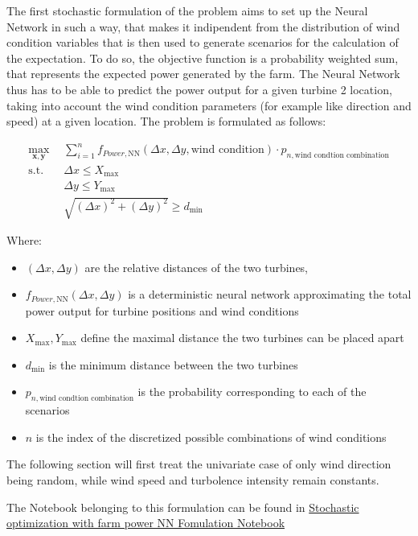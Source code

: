 \documentclass[preprint,12pt]{elsarticle}
\begin{document}
The first stochastic formulation of the problem aims to set up the Neural Network in such a way, that makes it indipendent from the distribution of wind condition variables that is then used to generate scenarios for the calculation of the expectation. To do so, the objective function is a probability weighted sum, that represents the expected power generated by the farm. The Neural Network thus  has to be able to predict the power output for a given turbine 2 location, taking into account the wind condition parameters (for example like direction and speed) at a given location. The problem is formulated as follows: 

\begin{align}
	\max_{\mathbf{x}, \mathbf{y}} &  \sum_{i=1}^{n} f_{Power,\text{NN}}(\Delta x, \Delta y, \text{wind condition})\cdot p_{n,\text{wind condtion combination}} \\
	\text{s.t.} \quad 
	&  \Delta x \leq X_{\max} \\
	&  \Delta y \leq Y_{\max} \\
	& \sqrt{(\Delta x)^2 + (\Delta y)^2} \geq d_{\min}
\end{align}

Where:
\begin{itemize}
	\item \( (\Delta x, \Delta y) \) are the relative distances of the two turbines,
	\item \( f_{Power, \text{NN}}(\Delta x, \Delta y)\) is a deterministic neural network  approximating the total power output for turbine positions and wind conditions
	\item \(  X_{\max}, Y_{\max} \) define the maximal distance the two turbines can be placed apart
	\item \( d_{\min} \) is the minimum distance between the two turbines
	\item \(p_{n, \text{wind condtion combination}}\) is the probability corresponding to each of the scenarios
	\item \( n \) is the index of the discretized possible combinations of wind conditions 
\end{itemize}

The following section will first treat the univariate case of only wind direction being random, while wind speed and turbolence intensity remain constants. 

The Notebook belonging to this formulation can be found in \href{https://github.com/schmeti/uc3m_TFM_wind_farm_optimization_codebase/blob/main/Windfarm_power_modelling/0_two_turbine_problem_constrLearn_probweighted.ipynb}{Stochastic optimization with farm power NN Fomulation Notebook} \cite{schmetz2025twoturbine_stoch1}
\end{document}
